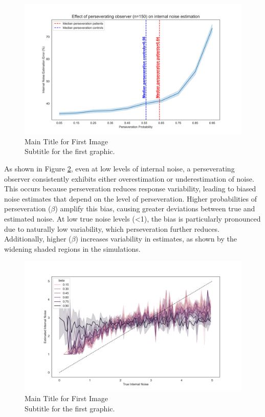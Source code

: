 \begin{figure}[H]
    \centering
    \includegraphics[width=15cm]{MainLayout/Images/chapter5/noise_perseverating_observer.jpg}
    \caption{Main Title for First Image \\ \small Subtitle for the first graphic.}
    \label{fig:noise_perseverating_observer}
\end{figure}

As shown in Figure \ref{fig:overestimation_noise}, even at low levels of internal noise, a perseverating observer consistently exhibits either overestimation or underestimation of noise. This occurs because perseveration reduces response variability, leading to biased noise estimates that depend on the level of perseveration. Higher probabilities of perseveration ($\beta$) amplify this bias, causing greater deviations between true and estimated noise. At low true noise levels (<1), the bias is particularly pronounced due to naturally low variability, which perseveration further reduces. Additionally, higher ($\beta$) increases variability in estimates, as shown by the widening shaded regions in the simulations.

\begin{figure}[H]
    \centering
    \includegraphics[width=15cm]{MainLayout/Images/chapter5/overestimation_noise.jpg}
    \caption{Main Title for First Image \\ \small Subtitle for the first graphic.}
    \label{fig:overestimation_noise}
\end{figure}


